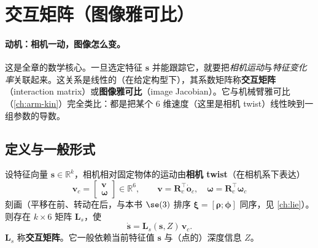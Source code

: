 \section{交互矩阵（图像雅可比）}
\label{sec:vs-interaction}

\paragraph{动机：相机一动，图像怎么变。}
这是全章的数学核心。一旦选定特征 $\mathbf{s}$ 并能跟踪它，就要把\emph{相机运动}与\emph{特征变化率}关联起来。这关系是线性的（在给定构型下），其系数矩阵称\textbf{交互矩阵}（interaction matrix）或\textbf{图像雅可比}（image Jacobian）。它与机械臂雅可比（\cref{ch:arm-kin}）完全类比：都是把某个 $6$ 维速度（这里是相机 twist）线性映到一组参数的导数。

\subsection{定义与一般形式}
\label{sec:vs-interaction-def}

\begin{definition}[交互矩阵]\label{def:vs-interaction}
设特征向量 $\mathbf{s}\in\mathbb{R}^k$，相机相对固定物体的运动由\textbf{相机 twist}（在相机系下表达）
\begin{equation}
  \mathbf{v}_c=\begin{bmatrix}\mathbf{v}\\\boldsymbol{\omega}\end{bmatrix}\in\mathbb{R}^6,
  \qquad \mathbf{v}=\mathbf{R}_c^\top\dot{\mathbf{o}}_c,\quad \boldsymbol{\omega}=\mathbf{R}_c^\top\boldsymbol{\omega}_c
  \label{eq:vs-camera-twist}
\end{equation}
刻画（平移在前、转动在后，与本书 $\se(3)$ 排序 $\boldsymbol{\xi}=[\boldsymbol{\rho};\boldsymbol{\phi}]$ 同序，见 \cref{ch:lie}）。则存在 $k\times6$ 矩阵 $\mathbf{L}_s$，使
\begin{equation}
  \boxed{\dot{\mathbf{s}}=\mathbf{L}_s(\mathbf{s},Z)\,\mathbf{v}_c.}
  \label{eq:vs-interaction-def}
\end{equation}
$\mathbf{L}_s$ 称\textbf{交互矩阵}。它一般依赖当前特征值 $\mathbf{s}$ 与（点的）深度信息 $Z$。
\end{definition}

